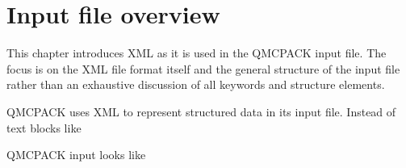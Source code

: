 \documentclass[letterpaper,10pt,english]{sphinxmanual}
\begin{document}
\chapter{Input file overview}
\label{\detokenize{input_overview:input-file-overview}}\label{\detokenize{input_overview:input-overview}}\label{\detokenize{input_overview::doc}}
This chapter introduces XML as it is used in the QMCPACK input file.  The focus is on the XML file format itself and the general structure of the input file rather than an exhaustive discussion of all keywords and structure elements.

QMCPACK uses XML to represent structured data in its input file.  Instead of text blocks like

\begin{sphinxVerbatim}[commandchars=\\\{\}]
 
        
    
 

 
        
      
        
    
 
\end{sphinxVerbatim}

QMCPACK input looks like

\begin{sphinxVerbatim}[commandchars=\\\{\}]
  

  
         
           
       
\end{sphinxVerbatim}
\end{document}
